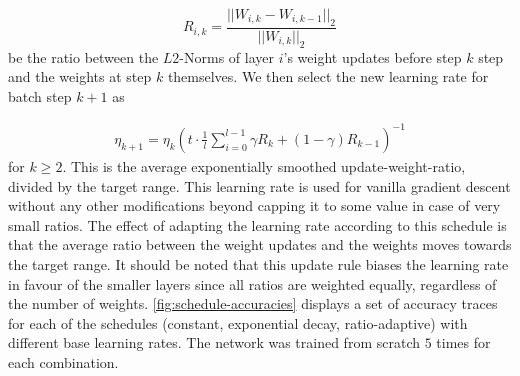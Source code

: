 \begin{equation}
    R_{i,k} = \frac{||W_{i,k} - W_{i,k-1}||_2}{||W_{i,k}||_2}
\end{equation}
be the ratio between the $L2$-Norms of layer $i$'s weight updates before step $k$ step
and the weights at step $k$ themselves.  We then select the new learning rate
for batch step $k+1$ as

\begin{align}
    \eta_{k+1}   = \eta_{k}
                   \left(
                   t \cdot \frac{1}{l}
                   \sum_{i=0}^{l-1} \gamma R_k + (1 - \gamma) R_{k-1}
                   \right)^{-1}
\end{align}
for $k \ge 2$.  This is the average exponentially smoothed update-weight-ratio,
divided by the target range. This learning rate is used for vanilla gradient
descent without any other modifications beyond capping it to some value in case
of very small ratios. The effect of adapting the learning rate according to this
schedule is that the average ratio between the weight updates and the weights
moves towards the target range.  It should be noted that this update rule biases
the learning rate in favour of the smaller layers since all ratios are weighted
equally, regardless of the number of weights.
\cref{fig:schedule-accuracies} displays a set of accuracy traces for each of the
schedules (constant, exponential decay, ratio-adaptive) with different base
learning rates. The network was trained from scratch $5$ times for each combination.

